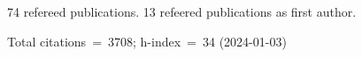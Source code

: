 74 refereed publications. 13 refeered publications as first author.

Total citations~=~3708; h-index~=~34 (2024-01-03)